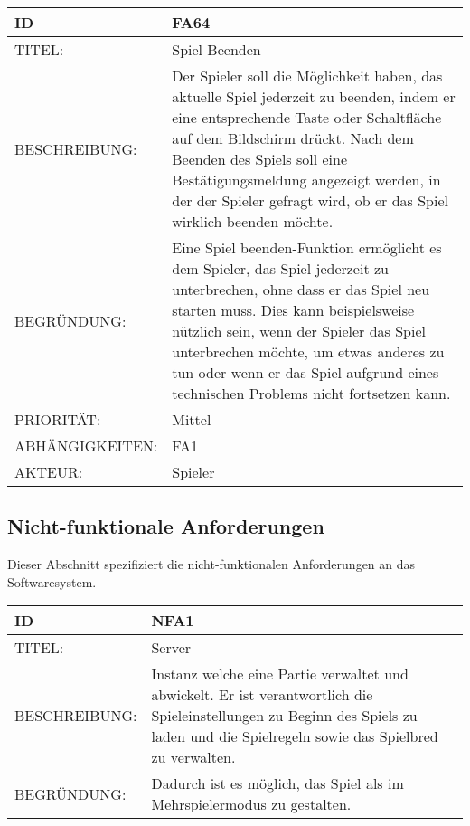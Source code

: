 \documentclass{uulm-assignment}
\begin{document}
    \begin{tabularx}{\textwidth}{|l|X |} \hline
        \textbf{ID} & \textbf{FA64}\\
        \hline
        TITEL: & Spiel Beenden
         \\
        \hline
        BESCHREIBUNG: &  Der Spieler soll die Möglichkeit haben, das aktuelle Spiel jederzeit zu beenden, indem er eine entsprechende Taste oder Schaltfläche auf dem Bildschirm drückt. Nach dem Beenden des Spiels soll eine Bestätigungsmeldung angezeigt werden, in der der Spieler gefragt wird, ob er das Spiel wirklich beenden möchte.
        \\
        \hline
        BEGRÜNDUNG: & Eine Spiel beenden-Funktion ermöglicht es dem Spieler, das Spiel jederzeit zu unterbrechen, ohne dass er das Spiel neu starten muss. Dies kann beispielsweise nützlich sein, wenn der Spieler das Spiel unterbrechen möchte, um etwas anderes zu tun oder wenn er das Spiel aufgrund eines technischen Problems nicht fortsetzen kann.
         \\
        \hline
        PRIORITÄT: & Mittel
        \\
        \hline
        ABHÄNGIGKEITEN: & FA1
         \\
        \hline
        AKTEUR: & Spieler
         \\
        \hline
    \end{tabularx}
    
    


    \subsection{Nicht-funktionale Anforderungen}

    Dieser Abschnitt spezifiziert die nicht-funktionalen Anforderungen an das Softwaresystem.
    

    
     \begin{tabularx}{\textwidth}{|l|X |} \hline
        \textbf{ID} & \textbf{NFA1} \\
        \hline
        TITEL: &  Server\\
        \hline
        BESCHREIBUNG: & Instanz welche eine Partie verwaltet und abwickelt.  Er ist verantwortlich die Spieleinstellungen zu Beginn des Spiels zu laden und die Spielregeln sowie das Spielbred zu verwalten.\\
        \hline
        BEGRÜNDUNG: &  Dadurch ist es möglich, das Spiel als im Mehrspielermodus zu gestalten.\\
        \hline
    \end{tabularx}
\end{document}
